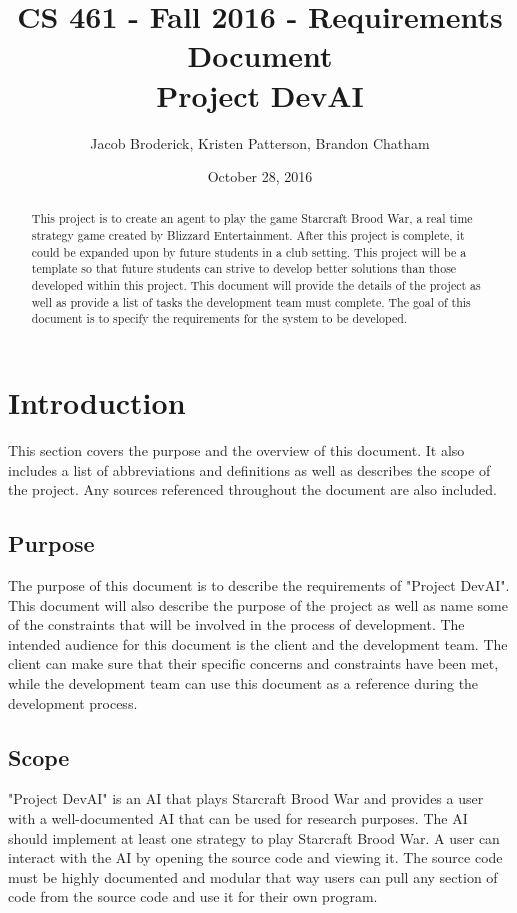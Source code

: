 
\begin{titlepage}

  \title{CS 461 - Fall 2016 - Requirements Document \\ Project DevAI}
  \author{Jacob Broderick, Kristen Patterson, Brandon Chatham}
  \date{October 28, 2016}
  \maketitle
  \vspace{4cm}
  \begin{abstract}
  	\noindent 
  	  	\noindent
	This project is to create an agent to play the game Starcraft Brood War, a real time strategy game created by Blizzard Entertainment. After this project is complete, it could be expanded upon by future students in a club setting. This project will be a template so that future students can strive to develop better solutions than those developed within this project. This document will provide the details of the project as well as provide a list of tasks the development team must complete. The goal of this document is to specify the requirements for the system to be developed.
   \end{abstract}
\end{titlepage}


\section{Introduction}
This section covers the purpose and the overview of this document. It also includes a list of abbreviations and definitions as well as describes the scope of the project. Any sources referenced throughout the document are also included.

\subsection{Purpose}
The purpose of this document is to describe the requirements of "Project DevAI". This document will also describe the purpose of the project as well as name some of the constraints that will be involved in the process of development. The intended audience for this document is the client and the development team. The client can make sure that their specific concerns and constraints have been met, while the development team can use this document as a reference during the development process.

\subsection{Scope}
"Project DevAI" is an AI that plays Starcraft Brood War and provides a user with a well-documented AI that can be used for research purposes. The AI should implement at least one strategy to play Starcraft Brood War. A user can interact with the AI by opening the source code and viewing it. The source code must be highly documented and modular that way users can pull any section of code from the source code and use it for their own program.

